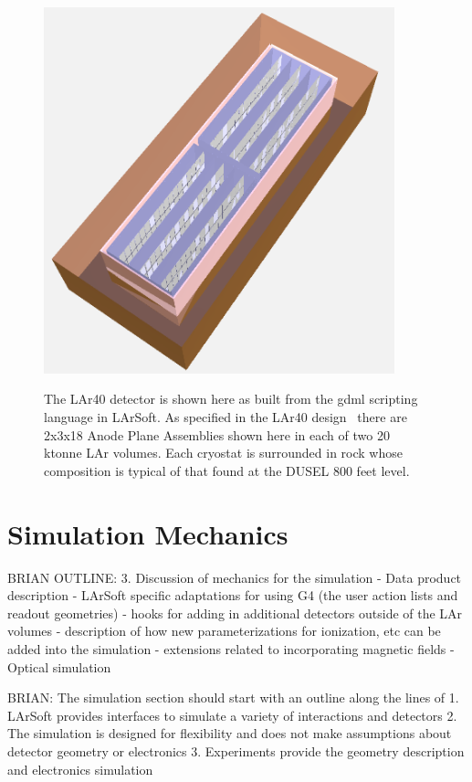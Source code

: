 \documentclass[12pt]{elsarticle}
\begin{document}
\hspace*{2cm}
\begin{figure}[h]
\centering
\caption{The LAr40 detector is shown here as built from the gdml scripting language in LArSoft. As specified in the LAr40 design~\cite{lar40CaseStudy} there are 2x3x18 Anode Plane Assemblies shown here in each of two 20 ktonne LAr volumes. Each cryostat is surrounded in rock whose composition is typical of that found at the DUSEL 800 feet level.}
\includegraphics[width=4.0in]{./mtrls/imgs/20111024_lbne_w_APAs2.png}
\label{lar40.img}
\end{figure}

                    
\section{Simulation Mechanics}
BRIAN OUTLINE: 3. Discussion of mechanics for the simulation
- Data product description
- LArSoft specific adaptations for using G4 (the user action lists and readout geometries)
- hooks for adding in additional detectors outside of the LAr volumes
- description of how new parameterizations for ionization, etc can be added into the simulation
- extensions related to incorporating magnetic fields
- Optical simulation

BRIAN: The simulation section should start with an outline along the lines of
1. LArSoft provides interfaces to simulate a variety of interactions and detectors
2.  The simulation is designed for flexibility and does not make assumptions about detector geometry or electronics
3.  Experiments provide the geometry description and electronics simulation
\end{document}
